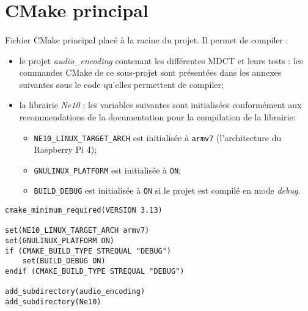\documentclass{article}
\begin{document}
\renewcommand{\contentsname}{Liste des annexes}
\tableofcontents

\newpage
\setcounter{page}{1}
\renewcommand{\thesection}{\Alph{section}} 

\section{CMake principal}\label{app:cmake_super}
\paragraph{}
Fichier CMake principal placé à la racine du projet. Il permet de compiler :
\begin{itemize}
    \item le projet \emph{audio\_encoding} contenant les différentes MDCT et leurs tests : les commandes CMake de ce sous-projet sont présentées dans les annexes suivantes sous le code qu'elles permettent de compiler;
    \item la librairie \emph{Ne10} : les variables suivantes sont initialisées conformément aux recommendations de la documentation pour la compilation de la librairie:
    \begin{itemize}
        \item \texttt{NE10\_LINUX\_TARGET\_ARCH} est initialisée à \texttt{armv7} (l'architecture du Raspberry Pi 4);
        \item \texttt{GNULINUX\_PLATFORM} est initialisée à \texttt{ON};
        \item \texttt{BUILD\_DEBUG} est initialisée à \texttt{ON} si le projet est compilé en mode \emph{debug}.
    \end{itemize}
\end{itemize}
\lstset{language=make}
\begin{lstlisting}
cmake_minimum_required(VERSION 3.13)

set(NE10_LINUX_TARGET_ARCH armv7)
set(GNULINUX_PLATFORM ON)
if (CMAKE_BUILD_TYPE STREQUAL "DEBUG")
    set(BUILD_DEBUG ON)
endif (CMAKE_BUILD_TYPE STREQUAL "DEBUG")

add_subdirectory(audio_encoding)
add_subdirectory(Ne10)
\end{lstlisting}
\end{document}
